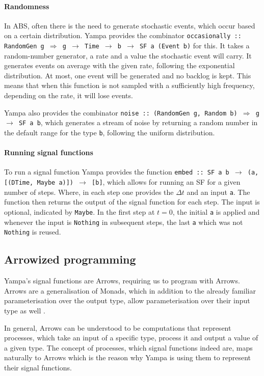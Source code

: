 \paragraph{Randomness}
In ABS, often there is the need to generate stochastic events, which occur based on a certain distribution. Yampa provides the combinator \texttt{occasionally :: RandomGen g $\Rightarrow$ g $\rightarrow$ Time $\rightarrow$ b $\rightarrow$ SF a (Event b)} for this. It takes a random-number generator, a rate and a value the stochastic event will carry. It generates events on average with the given rate, following the exponential distribution. At most, one event will be generated and no backlog is kept. This means that when this function is not sampled with a sufficiently high frequency, depending on the rate, it will lose events.

Yampa also provides the combinator \texttt{noise :: (RandomGen g, Random b) $\Rightarrow$ g $\rightarrow$ SF a b}, which generates a stream of noise by returning a random number in the default range for the type \texttt{b}, following the uniform distribution.

\paragraph{Running signal functions}
To run a signal function Yampa provides the function \texttt{embed :: SF a b $\rightarrow$ (a, [(DTime, Maybe a)]) $\rightarrow$ [b]}, which allows for running an SF for a given number of steps. Where, in each step one provides the $\Delta t$ and an input \texttt{a}. The function then returns the output of the signal function for each step. The input is optional, indicated by \texttt{Maybe}. In the first step at $t = 0$, the initial \texttt{a} is applied and whenever the input is \texttt{Nothing} in subsequent steps, the last \texttt{a} which was not \texttt{Nothing} is reused.

\subsection{Arrowized programming}
Yampa's signal functions are Arrows, requiring us to program with Arrows. Arrows are a generalisation of Monads, which in addition to the already familiar parameterisation over the output type, allow parameterisation over their input type as well \cite{hughes_generalising_2000, hughes_programming_2005}.

In general, Arrows can be understood to be computations that represent processes, which take an input of a specific type, process it and output a value of a given type. The concept of processes, which signal functions indeed are, maps naturally to Arrows which is the reason why Yampa is using them to represent their signal functions.

